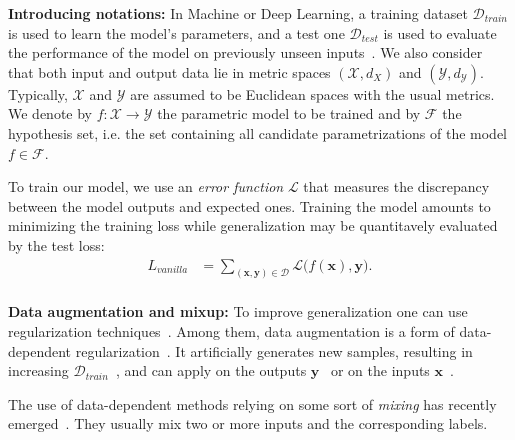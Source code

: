 \documentclass[twoside]{article}
\numberwithin{intassumption}{assumption}
\begin{document}
\textbf{Introducing notations:}
In Machine or Deep Learning, a training dataset $\mathcal{D}_{train}$ is used to learn the model's parameters, and a test one $\mathcal{D}_{test}$ is used to evaluate the performance of the model on previously unseen inputs~\citep{bishop2006pattern}. We also consider that both input and output data lie in metric spaces $(\mathcal{X},d_X)$ and $(\mathcal{Y},d_\mathcal{Y})$. Typically, $\mathcal{X}$ and $\mathcal{Y}$ are assumed to be Euclidean spaces with the usual metrics. We denote by $f:\mathcal{X} \to \mathcal{Y}$ the parametric model to be trained and by $\mathcal{F}$ the hypothesis set, i.e. the set containing all candidate parametrizations of the model  $f\in\mathcal{F}$.



To train our model, we use an \emph{error function} $\mathcal{L}$ that measures the discrepancy between the model outputs and expected ones. Training the model amounts to minimizing the training loss while generalization may be quantitavely evaluated by the test loss: 
\begin{align*}
    L_{vanilla} &= {\sum_{(\mathbf{x},\mathbf{y})\in \mathcal{D}}{\mathcal{L}(f(\mathbf{x}),\mathbf{y}}}). \\
\end{align*}

\textbf{Data augmentation and mixup:}
To improve generalization one can use regularization techniques~\citep{goodfellow2016deep}. Among them, data augmentation is a form of data-dependent regularization~\citep{guo2019mixup}.
It artificially generates new samples, resulting in increasing $\mathcal{D}_{train}$~\citep{dataaugmentation}, and can apply on the outputs $\mathbf{y}$~\citep{noisylabel} or on the inputs $\mathbf{x}$~\citep{colorful,cutoutorig,cutmixorig,autoaugment,horizontalflip,horizontalflip3}.









The use of data-dependent methods relying on some sort of \emph{mixing} has recently emerged~\citep{zhang2017mixup,manifold,cutmixorig,cutoutorig,augmix,puzzlemix,remix,automix,stackmix,batchmixup,mixmo}. They usually mix two or more inputs and the corresponding labels.
 
\end{document}
